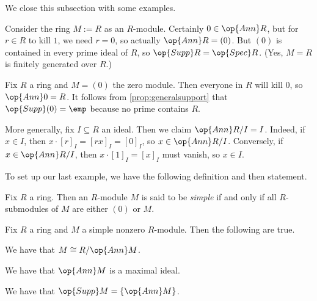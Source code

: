 We close this subsection with some examples.
\begin{example}
	Consider the ring $M:=R$ as an $R$-module. Certainly $0\in\op{Ann}R$, but for $r\in R$ to kill $1$, we need $r=0$, so actually $\op{Ann}R=(0)$. But $(0)$ is contained in every prime ideal of $R$, so $\op{Supp}R=\op{Spec}R$. (Yes, $M=R$ is finitely generated over $R$.)
\end{example}
\begin{ex} \label{ex:emptysupport}
	Fix $R$ a ring and $M=(0)$ the zero module. Then everyone in $R$ will kill $0$, so $\op{Ann}0=R$. It follows from \autoref{prop:generalsupport} that $\op{Supp}(0)=\emp$ because no prime contains $R$.
\end{ex}
\begin{example} \label{ex:annrmodi}
	More generally, fix $I\subseteq R$ an ideal. Then we claim $\op{Ann}R/I=I$. Indeed, if $x\in I$, then $x\cdot[r]_I=[rx]_I=[0]_I$, so $x\in\op{Ann}R/I$. Conversely, if $x\in\op{Ann}R/I$, then $x\cdot[1]_I=[x]_I$ must vanish, so $x\in I$.
\end{example}
To set up our last example, we have the following definition and then statement.
\begin{definition}[Simple]
	Fix $R$ a ring. Then an $R$-module $M$ is said to be \textit{simple} if and only if all $R$-submodules of $M$ are either $(0)$ or $M$.
\end{definition}
\begin{exe}
	Fix $R$ a ring and $M$ a simple nonzero $R$-module. Then the following are true.
	\begin{listalph}
		\item We have that $M\cong R/\op{Ann}M$.
		\item We have that $\op{Ann}M$ is a maximal ideal.
		\item We have that $\op{Supp}M=\{\op{Ann}M\}$.
	\end{listalph}
\end{exe}
